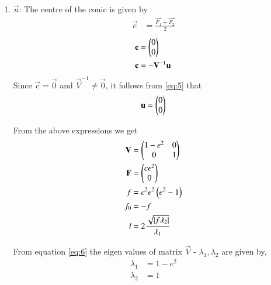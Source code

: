 \documentclass[journal,12pt,twocolumn]{IEEEtran}
\begin{document}
\begin{enumerate}
\begin{enumerate}
\item $\vec{u}$: The centre of the conic is given by
\begin{align}
\vec{c} &= \frac{\vec{F_1} + \vec{F_2}}{2}
\end{align}
\begin{align}
\mathbf{c} &= \begin{pmatrix}0\\0\end{pmatrix}\\
\mathbf{c} &= -\mathbf{V}^{-1}\mathbf{u}
\label{eq:5}
\end{align}
Since $\vec{c} = \vec{0}$ and $\vec{V}^{-1} \neq \vec{0}$, it follows from \eqref{eq:5} that 
\begin{align}
\mathbf{u} = \begin{pmatrix}0\\0\end{pmatrix}
\end{align}

From the above expressions we get
\begin{align}
\mathbf{V} &= \begin{pmatrix}1-e^2&0\\0&1\end{pmatrix} \label{eq:6} \\
\mathbf{F} &= \begin{pmatrix}ce^2\\0\end{pmatrix} \label{eq:7}\\
f &= c^2e^2\left(e^2-1\right) \label{eq:8}\\
f_0 &= - f \label{eq:9}\\
l &= 2\frac{\sqrt{\left\vert f\lambda_2\right\vert}}{\lambda_1}\label{eq:10}
\end{align}

From equation \eqref{eq:6} the eigen values of matrix $\vec{V}$ - $\lambda_1, \lambda_2$ are given by,
\begin{align}
\lambda_1 &= 1-e^2
\label{eq:11}\\
\lambda_2 &= 1
\label{eq:12}
\end{align}


\end{enumerate}
\end{enumerate}
\end{document}
